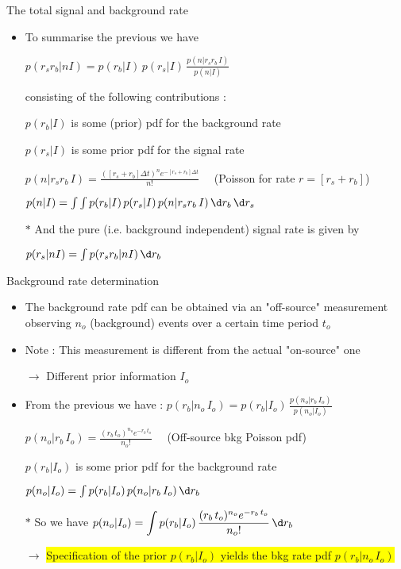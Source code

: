 \onecolumn
\begin{center}
{\red The total signal and background rate}
\end{center}
%
\begin{itemize}
\item To summarise the previous we have
\item[] \begin{center}{\blue $\displaystyle p(r_{s}r_{b}|nI)=p(r_{b}|I)\,p(r_{s}|I)\,\frac{p(n|r_{s}r_{b}\,I)}{p(n|I)}$}\end{center}
\item[] consisting of the following contributions :
\item[] $p(r_{b}|I)$ is some (prior) pdf for the background rate
\item[] $p(r_{s}|I)$ is some prior pdf for the signal rate
\item[] $\displaystyle p(n|r_{s}r_{b}\,I)=\frac{([r_{s}+r_{b}]\Delta t)^{n} e^{-[r_{s}+r_{b}]\Delta t}}{n!} \quad$
        (Poisson for rate $r=[r_{s}+r_{b}]$)
\item[] $p(n|I)=\int \int p(r_{b}|I)\,p(r_{s}|I)\,p(n|r_{s}r_{b}\,I)\,\d r_{b}\,\d r_{s}$
\item[$\ast$] And the pure (i.e. background independent) signal rate is given by 
\item[] \begin{center}{\blue $p(r_{s}|nI)=\int p(r_{s}r_{b}|nI)\,\d r_{b}$}\end{center}
\end{itemize}

\Tr
\begin{center}
{\red Background rate determination} 
\end{center}
%
\begin{itemize}
\item The background rate pdf can be obtained via an "off-source" measurement\\
      observing $n_{o}$ (background) events over a certain time period $t_{o}$
\item Note : This measurement is different from the actual "on-source" one
\item[] $\rightarrow$ Different prior information $I_{o}$
\item From the previous we have :
        {\blue $\displaystyle p(r_{b}|n_{o}\,I_{o})=p(r_{b}|I_{o})\,\frac{p(n_{o}|r_{b}\,I_{o})}{p(n_{o}|I_{o})}$}
\item[] {\blue $\displaystyle p(n_{o}|r_{b}\,I_{o})=\frac{(r_{b}\,t_{o})^{n_{o}} e^{-r_{b}\,t_{o}}}{n_{o}!} \quad$}
        (Off-source bkg Poisson pdf)
\item[] $p(r_{b}|I_{o})$ is some prior pdf for the background rate
\item[] $p(n_{o}|I_{o})=\int p(r_{b}|I_{o})\,p(n_{o}|r_{b}\,I_{o})\,\d r_{b}$
\item[$\ast$] So we have {\blue $\displaystyle p(n_{o}|I_{o})=\int p(r_{b}|I_{o})\,
        \frac{(r_{b}\,t_{o})^{n_{o}} e^{-r_{b}\,t_{o}}}{n_{o}!}\,\d r_{b}$}
\item[] $\rightarrow$ \colorbox{yellow}{Specification of the prior $p(r_{b}|I_{o})$ yields the bkg rate pdf $p(r_{b}|n_{o}\,I_{o})$}
\end{itemize}

